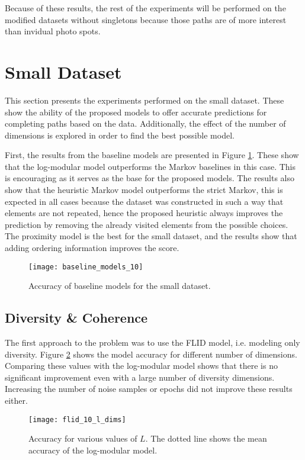Because of these results, the rest of the experiments will be performed on the modified datasets without singletons because those paths are of more interest than invidual photo spots.

\section{Small Dataset}

This section presents the experiments performed on the small dataset. These show the ability of the proposed models to offer accurate predictions for completing paths based on the data. Additionally, the effect of the number of dimensions is explored in order to find the best possible model.

First, the results from the baseline models are presented in Figure \ref{fig:small_baselines}. These show that the log-modular model outperforms the Markov baselines in this case. This is encouraging as it serves as the base for the proposed models. The results also show that the heuristic Markov model outperforms the strict Markov, this is expected in all cases because the dataset was constructed in such a way that elements are not repeated, hence the proposed heuristic always improves the prediction by removing the already visited elements from the possible choices. The proximity model is the best for the small dataset, and the results show that adding ordering information improves the score.

\begin{figure}
  \centering
  \texttt{[image: baseline\_models\_10]}
  \caption{Accuracy of baseline models for the small dataset.}
  \label{fig:small_baselines}
\end{figure}

\subsection{Diversity \& Coherence}

The first approach to the problem was to use the FLID model, i.e. modeling only diversity. Figure \ref{fig:flid_small_l_dims} shows the model accuracy for different number of dimensions. Comparing these values with the log-modular model shows that there is no significant improvement even with a large number of diversity dimensions. Increasing the number of noise samples or epochs did not improve these results either.

\begin{figure}
  \centering
  \texttt{[image: flid\_10\_l\_dims]}
  \caption{Accuracy for various values of $L$. The dotted line shows the mean accuracy of the log-modular model.}
  \label{fig:flid_small_l_dims}
\end{figure}

